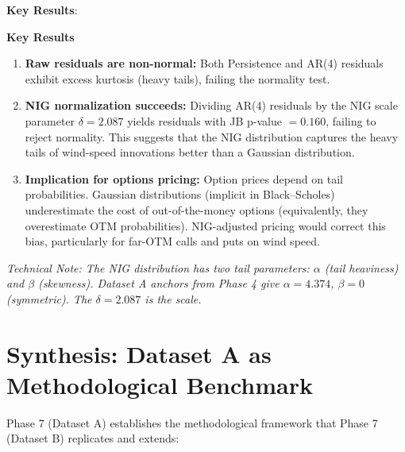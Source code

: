 \documentclass[11pt, a4paper, twoside]{article}
\begin{document}
\textbf{Key Results}:

\textbf{Key Results}

\begin{enumerate}
    \item \textbf{Raw residuals are non-normal:}
    Both Persistence and AR(4) residuals exhibit excess kurtosis
    (heavy tails), failing the normality test.

    \item \textbf{NIG normalization succeeds:}
    Dividing AR(4) residuals by the NIG scale parameter
    $\delta = 2.087$ yields residuals with JB p-value $=0.160$,
    failing to reject normality. This suggests that the NIG
    distribution captures the heavy tails of wind-speed innovations
    better than a Gaussian distribution.

    \item \textbf{Implication for options pricing:}
    Option prices depend on tail probabilities. Gaussian
    distributions (implicit in Black--Scholes) underestimate the
    cost of out-of-the-money options (equivalently, they
    overestimate OTM probabilities). NIG-adjusted pricing would
    correct this bias, particularly for far-OTM calls and puts on
    wind speed.
\end{enumerate}

{\itshape
Technical Note: The NIG distribution has two tail parameters:
$\alpha$ (tail heaviness) and $\beta$ (skewness). Dataset A anchors from
Phase 4 give $\alpha = 4.374$, $\beta = 0$ (symmetric). The
$\delta = 2.087$ is the scale.
}

\section{Synthesis: Dataset A as Methodological Benchmark}

Phase 7 (Dataset A) establishes the methodological framework that Phase 7 (Dataset B) replicates and extends:
\end{document}
